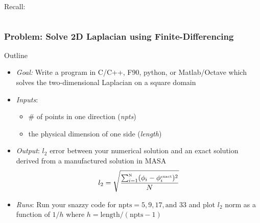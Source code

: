 \documentclass[mathserif]{beamer}
\begin{document}
\begin{frame}
\begin{columns}[c]
\begin{column}{6.5cm}
\begin{block}{Recall:}
\begin{itemize}
        \end{itemize}    
      \end{block}
      
    \end{column}
  \end{columns}

  
\end{frame}

 \begin{frame}
   \frametitle{Problem: Solve 2D Laplacian using Finite-Differencing}

   \begin{block}{Outline}
     \begin{itemize} 
     \item {\em Goal:} Write a program in C/C++, F90, python, or Matlab/Octave
       which solves the two-dimensional Laplacian on a square domain
     \item {\em Inputs}: 
       \begin{itemize}
	 \item \# of points in one direction ({\em npts})
	 \item the physical dimension of one side ({\em length})
       \end{itemize}
     \item {\em Output}: $l_2$ error between your numerical solution
       and an exact solution derived from a manufactured solution in
       MASA
       \begin{equation}
         \nonumber
         l_2 = \sqrt{ \frac{\sum_{i=1}^{\text{\tiny N}} (\phi_i-\phi_i^{\text{\tiny exact}})^2}N}
       \end{equation}
     \item {\em Runs}: Run your snazzy code for $\text{npts} =
       5,9,17,\text{and } 33$ and plot $l_2$ norm as a function of $1/h$ where
       $h=\text{length}/(\text{npts}-1)$
       
     \end{itemize}    
   \end{block}

 \end{frame}
\end{document}
